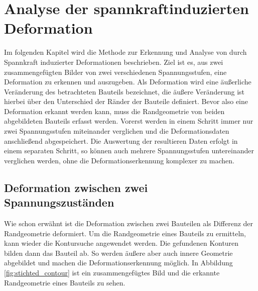 
\chapter{Analyse der spannkraftinduzierten Deformation}

Im folgenden Kapitel wird die Methode zur Erkennung und Analyse von durch 
Spannkraft induzierter Deformationen beschrieben. Ziel ist es, 
aus zwei zusammengefügten Bilder von zwei verschiedenen Spannungsstufen, 
eine Deformation zu erkennen und auszugeben.
Als Deformation wird eine äußerliche Veränderung des betrachteten Bauteils bezeichnet, 
die äußere Veränderung ist hierbei über den Unterschied der Ränder der Bauteile definiert.
Bevor also eine Deformation erkannt werden kann, muss die Randgeometrie von beiden
abgebildeten Bauteils erfasst werden.
Vorerst werden in einem Schritt immer nur zwei Spannungsstufen miteinander verglichen 
und die Deformationsdaten anschließend abgespeichert.
Die Auswertung der resultieren Daten erfolgt in einem separaten Schritt, so können auch
mehrere Spannungsstufen untereinander verglichen werden, ohne die Deformationserkennung 
komplexer zu machen.

\section{Deformation zwischen zwei Spannungszuständen}

Wie schon erwähnt ist die Deformation zwischen zwei Bauteilen als Differenz der 
Randgeometrie deformiert. Um die Randgeometrie eines Bauteils zu ermitteln, 
kann wieder die Kontursuche angewendet werden. Die gefundenen Konturen bilden dann 
das Bauteil ab. So werden äußere aber auch innere Geometrie abgebildet und machen die 
Deformationserkennung möglich. In Abbildung \ref{fig:stichted_contour} ist ein 
zusammengefügtes Bild und die erkannte Randgeometrie eines Bauteils zu sehen.

